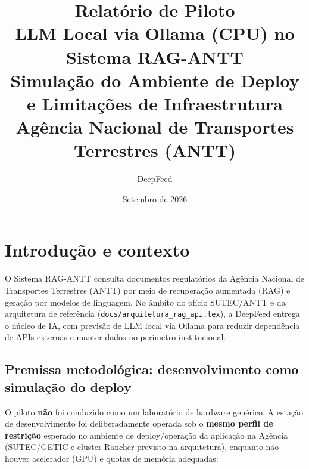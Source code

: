 \documentclass[12pt, a4paper]{article}
\title{%
  \vspace{-1cm}
  \textbf{Relatório de Piloto}\\[0.5cm]
  \Large LLM Local via Ollama (CPU) no Sistema RAG-ANTT\\
  Simulação do Ambiente de Deploy e Limitações de Infraestrutura\\[0.3cm]
  \large Agência Nacional de Transportes Terrestres (ANTT)
}
\author{%
  DeepFeed\\
}
\date{Setembro de 2026}
\begin{document}
\maketitle
\thispagestyle{empty}

\vspace{1cm}

\begin{center}
\end{center}

\newpage
\tableofcontents
\newpage

\section{Introdução e contexto}

O Sistema RAG-ANTT consulta documentos regulatórios da Agência Nacional de Transportes Terrestres (ANTT) por meio de recuperação aumentada (RAG) e geração por modelos de linguagem. No âmbito do ofício SUTEC/ANTT e da arquitetura de referência (\texttt{docs/arquitetura\_rag\_api.tex}), a DeepFeed entrega o núcleo de IA, com previsão de LLM local via Ollama para reduzir dependência de APIs externas e manter dados no perímetro institucional.

\subsection{Premissa metodológica: desenvolvimento como simulação do deploy}

O piloto \textbf{não} foi conduzido como um laboratório de hardware genérico. A estação de desenvolvimento foi deliberadamente operada sob o \textbf{mesmo perfil de restrição} esperado no ambiente de deploy/operação da aplicação na Agência (SUTEC/GETIC e cluster Rancher previsto na arquitetura), enquanto não houver acelerador (GPU) e quotas de memória adequadas:
\end{document}
